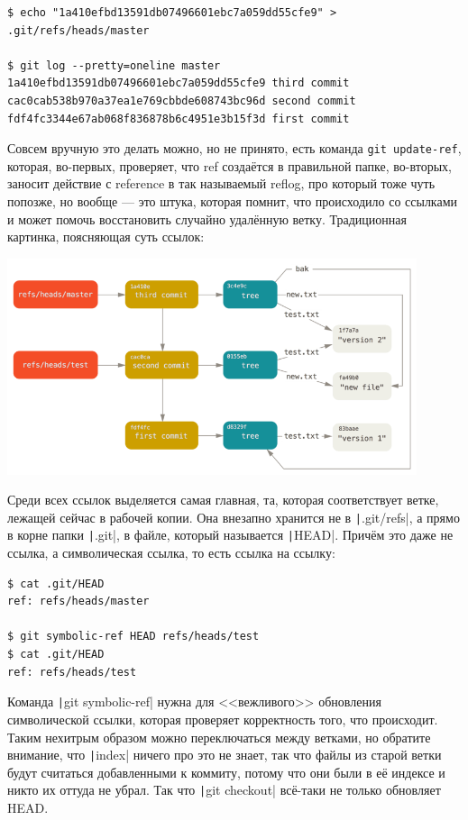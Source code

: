 \documentclass[a5paper]{article}
\begin{document}
\begin{verbatim}
$ echo "1a410efbd13591db07496601ebc7a059dd55cfe9" > .git/refs/heads/master

$ git log --pretty=oneline master
1a410efbd13591db07496601ebc7a059dd55cfe9 third commit
cac0cab538b970a37ea1e769cbbde608743bc96d second commit
fdf4fc3344e67ab068f836878b6c4951e3b15f3d first commit
\end{verbatim}

Совсем вручную это делать можно, но не принято, есть команда \verb|git update-ref|, которая, во-первых, проверяет, что ref создаётся в правильной папке, во-вторых, заносит действие с reference в так называемый reflog, про который тоже чуть попозже, но вообще --- это штука, которая помнит, что происходило со ссылками и может помочь восстановить случайно удалённую ветку. Традиционная картинка, поясняющая суть ссылок:

\begin{center}
    \includegraphics[width=0.9\textwidth]{gitRefs.png}
\end{center}

Среди всех ссылок выделяется самая главная, та, которая соответствует ветке, лежащей сейчас в рабочей копии. Она внезапно хранится не в \texttt|.git/refs|, а прямо в корне папки \texttt|.git|, в файле, который называется \texttt|HEAD|. Причём это даже не ссылка, а символическая ссылка, то есть ссылка на ссылку:

\begin{verbatim}
$ cat .git/HEAD
ref: refs/heads/master

$ git symbolic-ref HEAD refs/heads/test
$ cat .git/HEAD
ref: refs/heads/test
\end{verbatim}

Команда \texttt|git symbolic-ref| нужна для <<вежливого>> обновления символической ссылки, которая проверяет корректность того, что происходит. Таким нехитрым образом можно переключаться между ветками, но обратите внимание, что \texttt|index| ничего про это не знает, так что файлы из старой ветки будут считаться добавленными к коммиту, потому что они были в её индексе и никто их оттуда не убрал. Так что \texttt|git checkout| всё-таки не только обновляет HEAD.
\end{document}
